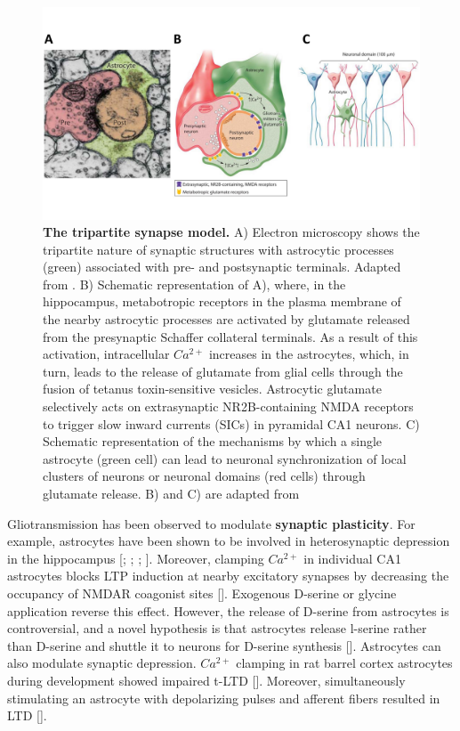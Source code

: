 \begin{figure}
    \centering
    \includegraphics[trim={0 60 0 70},clip,width=\textwidth]{Figures/Chapter1/intro_fig_astro_neuron_modulation.pdf}
    \caption[The tripartite synapse model]{\textbf{The tripartite synapse model.} 
    A) Electron microscopy shows the tripartite nature of synaptic structures with astrocytic processes (green) associated with pre- and postsynaptic terminals. 
    Adapted from \cite{mariotti2018}. 
    B) Schematic representation of A), where, in the hippocampus, metabotropic receptors in the plasma membrane of the nearby astrocytic processes are activated by glutamate released from the presynaptic Schaffer collateral terminals.
    As a result of this activation, intracellular $Ca^{2+}$ increases in the astrocytes, which, in turn, leads to the release of glutamate from glial cells through the fusion of tetanus toxin-sensitive vesicles. 
    Astrocytic glutamate selectively acts on extrasynaptic NR2B-containing NMDA receptors to trigger slow inward currents (SICs) in pyramidal CA1 neurons. 
    C) Schematic representation of the mechanisms by which a single astrocyte (green cell) can lead to neuronal synchronization of local clusters of neurons or neuronal domains (red cells) through glutamate release. 
    B) and C) are adapted from \cite{fellin2006}}
    \label{fig:chap1:astro_neuro_modulation}
\end{figure}

Gliotransmission has been observed to modulate \textbf{synaptic plasticity}.
For example, astrocytes have been shown to be involved in heterosynaptic depression in the hippocampus [\cite{pascual2005}; \cite{serrano2006gabaergic}; \cite{andersson2007}; \cite{chen2013heterosynaptic}].
Moreover, clamping $Ca^{2+}$ in individual CA1 astrocytes blocks LTP induction at nearby excitatory synapses by decreasing the occupancy of NMDAR coagonist sites [\cite{henneberger2010}].
Exogenous D-serine or glycine application reverse this effect. 
However, the release of D-serine from astrocytes is controversial, and a novel hypothesis is that astrocytes release l-serine rather than D-serine and shuttle it to neurons for D-serine synthesis [\cite{wolosker2016rise}]. 
Astrocytes can also modulate synaptic depression. 
$Ca^{2+}$ clamping in rat barrel cortex astrocytes during development showed impaired t-LTD [\cite{min2012astrocyte}].
Moreover, simultaneously stimulating an astrocyte with depolarizing pulses and afferent fibers resulted in LTD [\cite{min2012astrocyte}].

